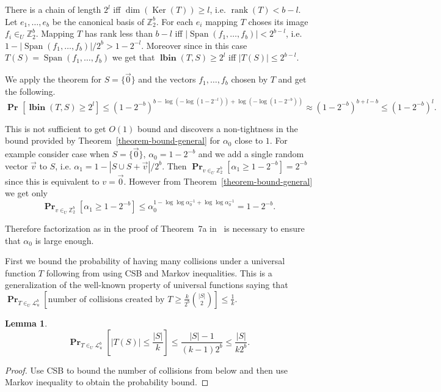 \documentclass{article}
\newcommand{\lbin}[2]{\operatorname{\mathbf{lbin}}({#1}, {#2})}
\newcommand{\vecspace}[2]{\mathbb{Z}_{#1}^{#2}}
\newcommand{\binvecspace}[1]{\vecspace{2}{#1}}
\newcommand{\linearmaps}[2]{\mathcal{L}_{#1}^{#2}}
\newcommand{\probs}[2]{\operatorname{\mathbf{Pr}}_{{#1}}\left[{#2}\right]}
\newtheorem{lemma}{Lemma}
\begin{document}
There is a chain of length $2^l$ iff $\operatorname{dim}(\operatorname{Ker}(T)) \geq l$, i.e. $\operatorname{rank}(T) < b - l$.
Let $e_1, \dots, e_b$ be the canonical basis of $\binvecspace{b}$. For each $e_i$ mapping  $T$ choses its image $f_i \in_U \binvecspace{b}$.
Mapping $T$ has rank less than $b - l$ iff $|\operatorname{Span}(f_1, \dots, f_b)| < 2^{b - l}$, i.e. $1 - |\operatorname{Span}(f_1, \dots, f_b)|/2^b > 1 - 2^{-l}$.
Moreover since in this case $T(S) = \operatorname{Span}(f_1, \dots, f_b)$ we get that $\lbin{T}{S} \geq 2^l$ iff $|T(S)| \leq 2^{b - l}$.

We apply the theorem for $S = \{\vec{0}\}$ and the vectors $f_1, \dots, f_b$ chosen by $T$ and get the following.
\[
\probs{}{\lbin{T}{S} \geq 2^l} \leq (1 - 2^{-b})^{b - \log (-\log (1 - 2^{-l})) + \log (-\log (1 - 2^{-b}))} \approx (1 - 2^{-b})^{b + l - b} \leq (1-2^{-b})^{l}.
\]

This is not sufficient to get $O(1)$ bound and discovers a non-tightness in the bound provided by Theorem~\ref{theorem-bound-general} for $\alpha_0$ close to $1$.
For example consider case when $S = \{\vec{0}\}$, $\alpha_0 = 1 - 2^{-b}$ and we add a single random vector $\vec{v}$ to $S$, i.e. $\alpha_1 = 1 - |S \cup S + \vec{v}|/2^b$.
Then $\probs{v\in_U\binvecspace{b}}{\alpha_1 \geq 1 - 2^{-b}} = 2^{-b}$ since this is equivalent to $v = \vec{0}$.
However from Theorem~\ref{theorem-bound-general} we get only
\[
\probs{v\in_U\binvecspace{b}}{\alpha_1 \geq 1 - 2^{-b}} \leq \alpha_0^{1 - \log \log \alpha_0^{-1} + \log \log \alpha_0^{-1}} = 1 - 2^{-b}.
\]

Therefore factorization as in the proof of Theorem~7a in~\cite{alonetal} is necessary to ensure that $\alpha_0$ is large enough.

First we bound the probability of having many collisions under a universal function $T$ following from using CSB and Markov inequalities.
This is a generalization of the well-known property of universal functions saying that $\probs{T \in_U \linearmaps{u}{b}}{\mbox{number of collisions created by }T \geq \frac{k}{2^b} {|S| \choose 2}} \leq \frac{1}{k}$.
\begin{lemma}
\label{lemma-collisions-general}
\[
\probs{T \in_U \linearmaps{u}{b}}{|T(S)| \leq \frac{|S|}{k}} \leq \frac{|S| - 1}{(k - 1)2^b} \leq \frac{|S|}{k2^b}.
\]
\end{lemma}
\begin{proof}
Use CSB to bound the number of collisions from below and then use Markov inequality to obtain the probability bound.
\end{proof}
\end{document}
